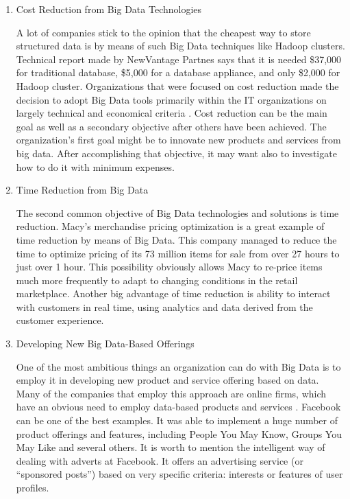 \documentclass[runningheads]{llncs}
\begin{document}
\begin{enumerate}
\item Cost Reduction from Big Data Technologies

A lot of companies stick to the opinion that the cheapest way to store structured data is by means of such Big Data techniques like Hadoop clusters. Technical report \cite{NEWVANTAGE} made by NewVantage Partnes says that it is needed \$37,000 for traditional database, \$5,000 for a database appliance, and only \$2,000 for Hadoop cluster. Organizations that were focused on cost reduction made the decision to adopt Big Data tools primarily within the IT organizations on largely technical and economical criteria \cite{DAVENPORT}. Cost reduction can be the main goal as well as a secondary objective after others have been achieved. The organization's first goal might be to innovate new products and services from big data. After accomplishing that objective, it may want also to investigate how to do it with minimum expenses.\\

\item Time Reduction from Big Data

The second common objective of Big Data technologies and solutions is time reduction. Macy's merchandise pricing optimization is a great example of time reduction by means of Big Data. This company managed to reduce the time to optimize pricing of its 73 million items for sale from over 27 hours to just over 1 hour. This possibility obviously allows Macy to re-price items much more frequently to adapt to changing conditions in the retail marketplace\cite{DAVENPORT}. Another big advantage of time reduction is ability to interact with customers in real time, using analytics and data derived from the customer experience.\\

\item Developing New Big Data-Based Offerings

One of the most ambitious things an organization can do with Big Data is to employ it in developing new product and service offering based on data. Many of the companies that employ this approach are online firms, which have an obvious need to employ data-based products and services \cite{DAVENPORT}. Facebook can be one of the best examples. It was able to implement a huge number of product offerings and features, including People You May Know, Groups You May Like and several others. It is worth to mention the intelligent way of dealing with adverts at Facebook. It offers an advertising service (or “sponsored posts”) based on very specific criteria: interests or features of user profiles. 


\end{enumerate}
\end{document}
